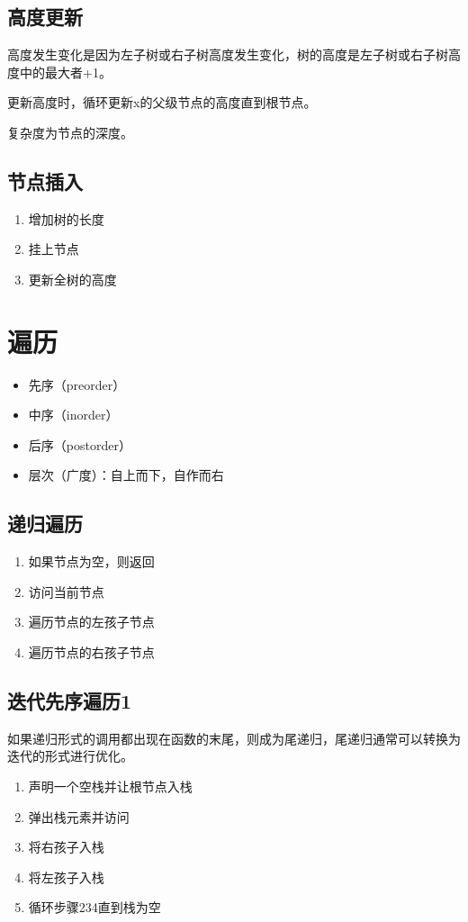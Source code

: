 \documentclass{article}
\begin{document}
\subsection{高度更新}
高度发生变化是因为左子树或右子树高度发生变化，树的高度是左子树或右子树高度中的最大者+1。

更新高度时，循环更新x的父级节点的高度直到根节点。

复杂度为节点的深度。

\subsection{节点插入}

\begin{enumerate}
  \item 增加树的长度
  \item 挂上节点
  \item 更新全树的高度
\end{enumerate}

\section{遍历}

\begin{itemize}
  \item 先序（preorder）
  \item 中序（inorder）
  \item 后序（postorder）
  \item 层次（广度）：自上而下，自作而右
\end{itemize}

\subsection{递归遍历}
\begin{enumerate}
  \item 如果节点为空，则返回
  \item 访问当前节点
  \item 遍历节点的左孩子节点
  \item 遍历节点的右孩子节点
\end{enumerate}

\subsection{迭代先序遍历1}

如果递归形式的调用都出现在函数的末尾，则成为尾递归，尾递归通常可以转换为迭代的形式进行优化。
\begin{enumerate}
  \item 声明一个空栈并让根节点入栈
  \item 弹出栈元素并访问
  \item 将右孩子入栈
  \item 将左孩子入栈
  \item 循环步骤234直到栈为空
\end{enumerate}
\end{document}
